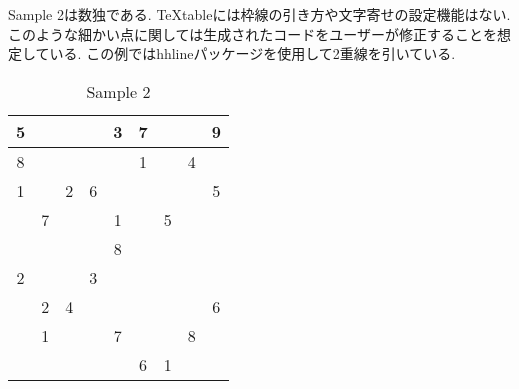 \documentclass{jsarticle}
\begin{document}
Sample 2は数独である.
TeXtableには枠線の引き方や文字寄せの設定機能はない.
このような細かい点に関しては生成されたコードをユーザーが修正することを想定している.
この例ではhhlineパッケージを使用して2重線を引いている.
\vspace{-0.5em}
\begin{table}[htb]
	\captionsetup{labelformat=empty,labelsep=none}
	\caption{Sample 2}
	\label{sample2}
	\centering
	\begin{tabular}{|c|c|c||c|c|c||c|c|c|}\hline
		5	&	&	&	&3	&7	&	&	&9	\\ \hline
		8	&	&	&	&	&1	&	&4	&	\\ \hline
		1	&	&2	&6	&	&	&	&	&5	\\ \hhline{|=|=|=#=|=|=#=|=|=|}
			&7	&	&	&1	&	&5	&	&	\\ \hline
			&	&	&	&8	&	&	&	&	\\ \hline
		2	&	&	&3	&	&	&	&	&	\\ \hhline{|=|=|=#=|=|=#=|=|=|}
			&2	&4	&	&	&	&	&	&6	\\ \hline
			&1	&	&	&7	&	&	&8	&	\\ \hline
			&	&	&	&	&6	&1	&	&	\\ \hline
	\end{tabular}
\end{table}
\end{document}
